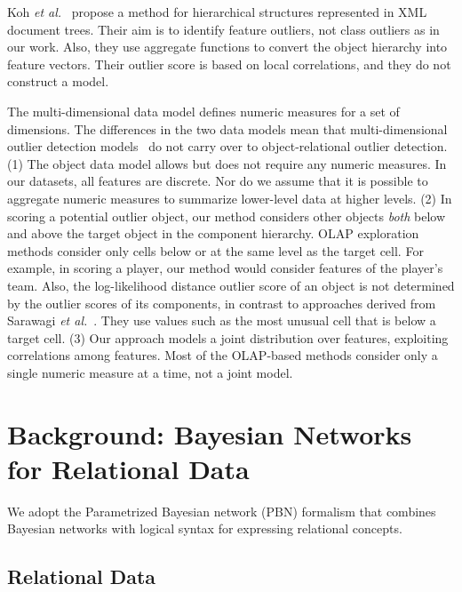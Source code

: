 {				
				Koh {\em et al.}~\citep{Koh2008} propose a method for hierarchical structures represented in XML document trees. Their aim is to identify feature outliers, not class outliers as in our work. Also, they use aggregate functions to convert the object hierarchy into feature vectors. Their outlier score is based on local correlations, and they do not construct a model.
				
				
				The multi-dimensional data model defines numeric measures for a set of dimensions. 
				The differences in the two data models mean that multi-dimensional outlier detection models~\citep{Sarawagi1998} do not carry over to object-relational outlier detection. (1) The object data model allows but does not require any numeric measures. In our datasets, all features are discrete. Nor do we assume that it is possible to aggregate numeric measures to summarize lower-level data at higher levels.  
				(2) In scoring a potential outlier object, our method considers other objects {\em both} below and above the target object in the component hierarchy. OLAP exploration methods consider only cells below or at the same level as the target cell. For example, in scoring a player, our method would consider features of the player's team.  
				Also, the log-likelihood distance outlier score of an object is not determined by the outlier scores of its components, in contrast to approaches derived from Sarawagi {\em et al.}~\citep{Sarawagi1998}. They use values such as the most unusual cell that is below a target cell.
				(3) Our approach models a joint distribution over features, exploiting correlations among features. Most of the OLAP-based methods consider only a single numeric measure at a time, not a joint model.  




\section{Background: Bayesian Networks for Relational Data}
We adopt  
the Parametrized Bayesian network (PBN) formalism \citep{Poole2003} that combines Bayesian networks with logical syntax for expressing relational concepts. 


\subsection{Relational Data}




}
